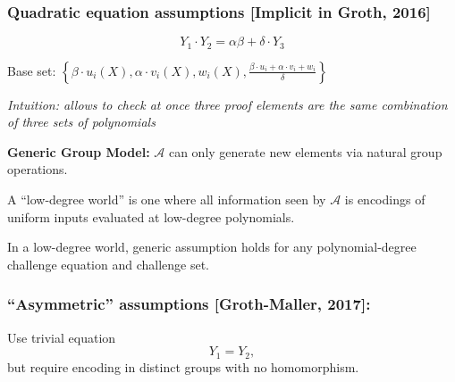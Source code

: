 \documentclass[shadesubsections,trans,14pt,mathserif]{beamer}
\newcommand{\adv}{\ensuremath{\mathcal A}}
\newcommand{\set}[1]{\ensuremath{\left\{#1\right\}}}
\begin{document}
 
 \begin{frame}
 \frametitle{Quadratic equation assumptions [Implicit in Groth, 2016]}
 
 
 \[Y_1\cdot Y_2= \alpha\beta + \delta \cdot Y_{3}\]
  \vspace{0.3in}
 
 
 Base set: $\set{\beta\cdot u_i(X),\alpha\cdot v_i(X), w_i(X),
 \frac{\beta \cdot u_i+\alpha\cdot v_i+w_i}{\delta}}$
  \vspace{0.3in}
 
 \emph{Intuition: allows to check at once three proof elements are the same combination of three sets of polynomials }
 
 \end{frame}
\begin{frame}
 \textbf{Generic Group Model:}
 $\adv$ can only generate new elements via natural group operations.\\
 
\vspace{0.3in}
 
 \begin{definition}
  A ``low-degree world'' is one where all information seen by $\adv$ is encodings of uniform inputs evaluated at low-degree polynomials. 
 \end{definition}
 

 \end{frame}
\begin{frame}
 \vspace{0.3in}
 \begin{lemma}
  In a low-degree world, generic assumption holds for any polynomial-degree challenge equation and challenge set.
 \end{lemma}

 

 \end{frame}

 \begin{frame}
 \frametitle{``Asymmetric'' assumptions [Groth-Maller, 2017]:}
Use trivial equation
\[Y_1=Y_2,\]
but require encoding in distinct groups with no homomorphism.

 

 \end{frame}
\end{document}
